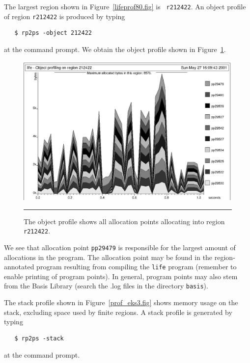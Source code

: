 \documentclass[12pt]{book}
\begin{document}
The largest region shown in Figure~\ref{lifeprof80.fig} is {\tt
  r212422}. An
%
%
object profile of region {\tt r212422} is produced by typing
\begin{verbatim}
   $ rp2ps -object 212422
\end{verbatim}
at the command prompt. We obtain the object profile shown in
Figure~\ref{prof_eks2.fig}.
\begin{figure}
\begin{center}
\includegraphics{prof_eks2.ps}
\end{center}
\caption{The object profile shows all allocation points allocating into region {\tt r212422}.}
\label{prof_eks2.fig}
\medskip\hrule
\end{figure}

We see that allocation point \texttt{pp29479} is responsible for the
largest amount of allocations in the program. The allocation point may
be found in the region-annotated program resulting from compiling the
{\tt life} program (remember to enable printing of program points). In
general, program points may also stem from the Basis Library (search
the {.log} files in the directory {\tt basis}).

The stack profile shown in Figure~\ref{prof_eks3.fig} shows memory
usage on the stack, excluding space used by finite regions. A 
%
%
stack profile is generated by typing
\begin{verbatim}
   $ rp2ps -stack
\end{verbatim}
at the command prompt.
\end{document}
